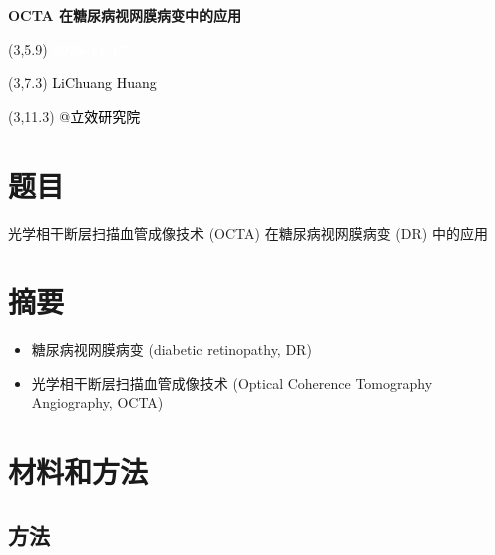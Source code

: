 \documentclass[
]{article}
\author{}
\date{\vspace{-2.5em}}
\providecommand{\tightlist}{%
  \setlength{\itemsep}{0pt}\setlength{\parskip}{0pt}}
\begin{document}
\begin{titlepage} 
\begin{center} \textbf{\Huge OCTA
在糖尿病视网膜病变中的应用} \vspace{4em}
\begin{textblock}{10}(3,5.9) \huge
\textbf{\textcolor{white}{2023-11-17}}
\end{textblock} \begin{textblock}{10}(3,7.3)
\Large \textcolor{black}{LiChuang Huang}
\end{textblock} \begin{textblock}{10}(3,11.3)
\Large \textcolor{black}{@立效研究院}
\end{textblock} \end{center} \end{titlepage}
\restoregeometry


\tableofcontents

\listoffigures

\listoftables

\newpage


\hypertarget{ux9898ux76ee}{%
\section{题目}\label{ux9898ux76ee}}

光学相干断层扫描血管成像技术 (OCTA) 在糖尿病视网膜病变 (DR) 中的应用

\hypertarget{abstract}{%
\section{摘要}\label{abstract}}

\begin{itemize}
\tightlist
\item
  糖尿病视网膜病变 (diabetic retinopathy, DR)
\item
  光学相干断层扫描血管成像技术 (Optical Coherence Tomography Angiography, OCTA)
\end{itemize}

\hypertarget{methods}{%
\section{材料和方法}\label{methods}}

\hypertarget{meth}{%
\subsection{方法}\label{meth}}
\end{document}
